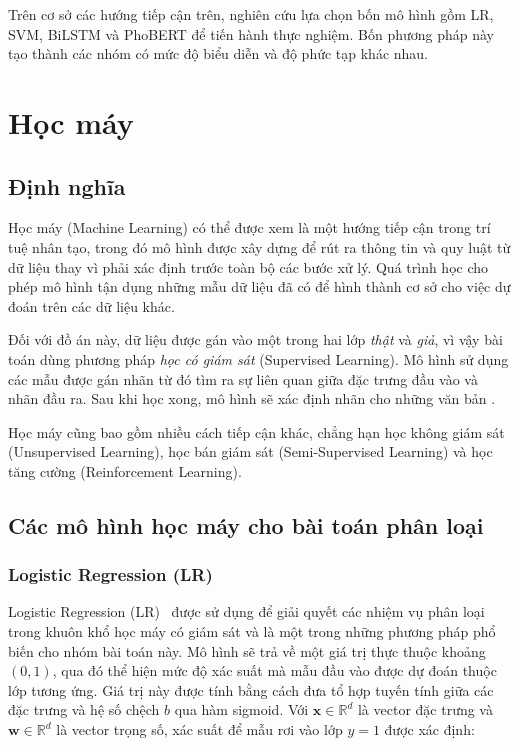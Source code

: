 Trên cơ sở các hướng tiếp cận trên, nghiên cứu lựa chọn bốn mô hình gồm LR, SVM, BiLSTM và PhoBERT để tiến hành thực nghiệm. Bốn phương pháp này tạo thành các nhóm có mức độ biểu diễn và độ phức tạp khác nhau.

\section{Học máy}\label{sec:hocmay}

\subsection{Định nghĩa}

Học máy (Machine Learning) có thể được xem là một hướng tiếp cận trong trí tuệ nhân tạo, trong đó mô hình được xây dựng để rút ra thông tin và quy luật từ dữ liệu thay vì phải xác định trước toàn bộ các bước xử lý. Quá trình học cho phép mô hình tận dụng những mẫu dữ liệu đã có để hình thành cơ sở cho việc dự đoán trên các dữ liệu khác.

Đối với đồ án này, dữ liệu được gán vào một trong hai lớp \textit{thật} và \textit{giả}, vì vậy bài toán dùng phương pháp \textit{học có giám sát} (Supervised Learning). Mô hình sử dụng các mẫu được gán nhãn từ đó tìm ra sự liên quan giữa đặc trưng đầu vào và nhãn đầu ra. Sau khi học xong, mô hình sẽ xác định nhãn cho những văn bản .

Học máy cũng bao gồm nhiều cách tiếp cận khác, chẳng hạn học không giám sát (Unsupervised Learning), học bán giám sát (Semi-Supervised Learning) và học tăng cường (Reinforcement Learning).

\subsection{Các mô hình học máy cho bài toán phân loại}

\subsubsection{Logistic Regression (LR)}
Logistic Regression (LR)~\cite{cox1958regression} được sử dụng để giải quyết các nhiệm vụ phân loại trong khuôn khổ học máy có giám sát và là một trong những phương pháp phổ biến cho nhóm bài toán này. Mô hình sẽ trả về một giá trị thực thuộc khoảng \((0,1)\), qua đó thể hiện mức độ xác suất mà mẫu đầu vào được dự đoán thuộc lớp tương ứng.
Giá trị này được tính bằng cách đưa tổ hợp tuyến tính giữa các đặc trưng và hệ số chệch $b$ qua hàm sigmoid. Với $\mathbf{x} \in \mathbb{R}^d$ là vector đặc trưng và $\mathbf{w} \in \mathbb{R}^d$ là vector trọng số, xác suất để mẫu rơi vào lớp $y=1$ được xác định:

